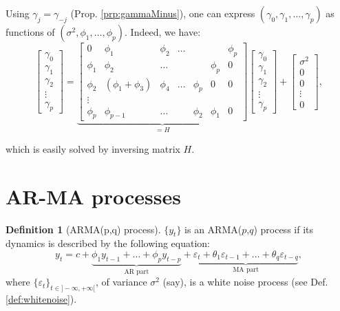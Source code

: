 \documentclass[
  12pt,
]{book}
\theoremstyle{definition}
\newtheorem{definition}{Definition}[chapter]
\theoremstyle{definition}
\theoremstyle{definition}
\theoremstyle{definition}
\theoremstyle{remark}
\begin{document}
Using \(\gamma_j = \gamma_{-j}\) (Prop. \ref{prp:gammaMinus}), one can express \((\gamma_0,\gamma_1,\dots,\gamma_{p})\) as functions of \((\sigma^2,\phi_1,\dots,\phi_p)\). Indeed, we have:
\[
\left[\begin{array}{c}
\gamma_0 \\
\gamma_1 \\
\gamma_2 \\
\vdots\\
\gamma_p
\end{array}\right] =
\underbrace{\left[\begin{array}{cccccccc}
0 & \phi_1 & \phi_2 & \dots &&& \phi_p \\
\phi_1 & \phi_2 & \dots &&& \phi_p & 0 \\
\phi_2 & (\phi_1 + \phi_3) & \phi_4 & \dots & \phi_p& 0& 0 \\
\vdots\\
\phi_p & \phi_{p-1} & \dots &&\phi_2& \phi_1 & 0
\end{array}\right]}_{=H}\left[\begin{array}{c}
\gamma_0 \\
\gamma_1 \\
\gamma_2 \\
\vdots\\
\gamma_p
\end{array}\right] +
\left[\begin{array}{c}
\sigma^2 \\
0 \\
0 \\
\vdots\\
0
\end{array}\right],
\]

which is easily solved by inversing matrix \(H\).

\hypertarget{ar-ma-processes}{%
\section{AR-MA processes}\label{ar-ma-processes}}

\begin{definition}[ARMA(p,q) process]
\protect\hypertarget{def:ARMApq}{}\label{def:ARMApq}\(\{y_t\}\) is an ARMA(\(p\),\(q\)) process if its dynamics is described by the following equation:
\begin{equation}
y_t = c + \underbrace{\phi_1 y_{t-1} + \dots + \phi_p y_{t-p}}_{\mbox{AR part}} + \underbrace{\varepsilon_t + \theta_1 \varepsilon_{t-1} + \dots + \theta_q \varepsilon_{t-q}}_{\mbox{MA part}},\label{eq:ARMApq}
\end{equation}
where \(\{\varepsilon_t\}_{t \in ] -\infty,+\infty[}\), of variance \(\sigma^2\) (say), is a white noise process (see Def. \ref{def:whitenoise}).
\end{definition}
\end{document}

